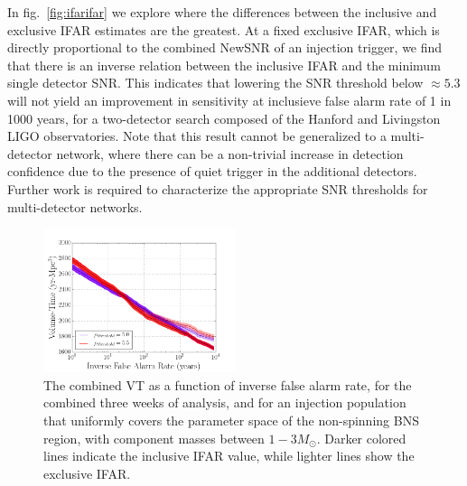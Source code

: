 In fig.~\ref{fig:ifarifar} we explore where the differences between the inclusive and exclusive IFAR estimates are the greatest. At a fixed exclusive IFAR, which is directly proportional to the combined NewSNR of an injection trigger, we find that there is an inverse relation between the inclusive IFAR and the minimum single detector SNR. This indicates that lowering the SNR threshold below $\approx 5.3$ will not yield an improvement in sensitivity at inclusieve false alarm rate of 1 in 1000 years, for a two-detector search composed of the Hanford and Livingston LIGO observatories. Note that this result cannot be generalized to a multi-detector network, where there can be a non-trivial increase in detection confidence due to the presence of quiet trigger in the additional detectors. Further work is required to characterize the appropriate SNR thresholds for multi-detector networks.



\begin{figure}
\includegraphics[width=0.5\textwidth]{papers/bns_o1_dev/figures/snr_combined.png}
\caption{\label{fig:snrthreshold} 
The combined VT as a function of inverse false alarm rate, for the combined three weeks of analysis, and for an injection population that uniformly covers the parameter space of the non-spinning BNS region, with component masses between $1- 3M_\odot$. Darker colored lines indicate the inclusive IFAR value, while lighter lines show the exclusive IFAR. 
}
\end{figure}

